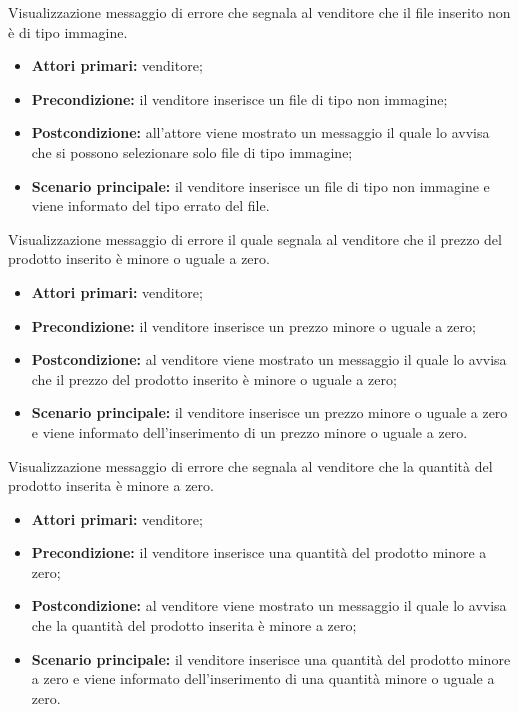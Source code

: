 
Visualizzazione messaggio di errore che segnala al venditore che il file inserito non è di tipo immagine.
\begin{itemize}
    \item \textbf{Attori primari:} venditore;
    \item \textbf{Precondizione:} il venditore inserisce un file di tipo non immagine;
    \item \textbf{Postcondizione:} all'attore viene mostrato un messaggio il quale lo avvisa che si possono selezionare solo file di tipo immagine;
    \item \textbf{Scenario principale:} il venditore inserisce un file di tipo non immagine e viene informato del tipo errato del file.
\end{itemize}


Visualizzazione messaggio di errore il quale segnala al venditore che il prezzo del prodotto inserito è minore o uguale a zero.
\begin{itemize}
    \item \textbf{Attori primari:} venditore;
    \item \textbf{Precondizione:} il venditore inserisce un prezzo minore o uguale a zero;
    \item \textbf{Postcondizione:} al venditore viene mostrato un messaggio il quale lo avvisa che il prezzo del prodotto inserito è minore o uguale a zero;
    \item \textbf{Scenario principale:} il venditore inserisce un prezzo minore o uguale a zero e viene informato dell'inserimento di un prezzo minore o uguale a zero.
\end{itemize}


Visualizzazione messaggio di errore che segnala al venditore che la quantità del prodotto inserita è minore a zero.
\begin{itemize}
    \item \textbf{Attori primari:} venditore;
    \item \textbf{Precondizione:} il venditore inserisce una quantità del prodotto minore a zero;
    \item \textbf{Postcondizione:} al venditore viene mostrato un messaggio il quale lo avvisa che la quantità del prodotto inserita è minore a zero;
    \item \textbf{Scenario principale:} il venditore inserisce una quantità del prodotto minore a zero e viene informato dell'inserimento di una quantità minore o uguale a zero.
\end{itemize}

